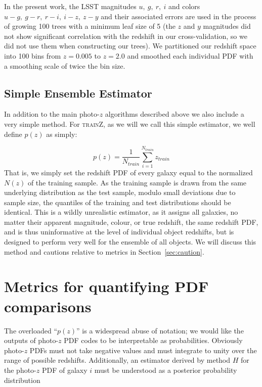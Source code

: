 \documentclass[usenatbib]{mn2e}
\newcommand{\trainz}{\textsc{trainZ}}
\newcommand{\red}[1]{\textcolor{red}{#1}}
\begin{document}
In the present work, the LSST magnitudes $u,~g,~r,~i$ and colors $u-g,~g-r,~r-i,~i-z,~z-y$ and their associated errors are used in the process of growing 100 trees with a minimum leaf size of 5 (the $z$ and $y$ magnitudes did not show significant correlation with the redshift in our cross-validation, so we did not use them when constructing our trees). We partitioned our redshift space into 100 bins from $z=0.005$ to $z=2.0$ and smoothed each individual PDF with a smoothing scale of twice the bin size.

\subsection{Simple Ensemble Estimator}\label{sec:method:trainz}
In addition to the main photo-$z$ algorithms described above we also include a very simple method.  For \trainz, as we will we call this simple estimator, we well define $p(z)$ as simply:

\begin{equation}
p(z) = \frac{1}{N_{train}}\sum_{i=1}^{N_{train}}z_{train}
\end{equation}
That is, we simply set the redshift PDF of every galaxy equal to the normalized $N(z)$ of the training sample.  As the training sample is drawn from the same underlying distribution as the test sample, modulo small deviations due to sample size, the quantiles of the training and test distributions should be identical.  This is a wildly unrealistic estimator, as it assigns all galaxies, no matter their apparent magnitude, colour, or true redshift, the same redshift PDF, and is thus uninformative at the level of individual object redshifts, but is designed to perform very well for the ensemble of all objects.  We will discuss this method and cautions relative to metrics in Section~\ref{sec:caution}.

\section{Metrics for quantifying PDF comparisons}
\label{sec:metrics}


The overloaded ``$p(z)$'' is a widespread abuse of notation; we would like the outputs of photo-$z$ PDF codes to be interpretable as probabilities. 
Obviously photo-$z$ PDFs must not take negative values and must integrate to unity over the range of possible redshifts. 
Additionally, an estimator derived by method $H$ for the photo-$z$ PDF of galaxy $i$ must be understood as a posterior probability distribution
\end{document}
